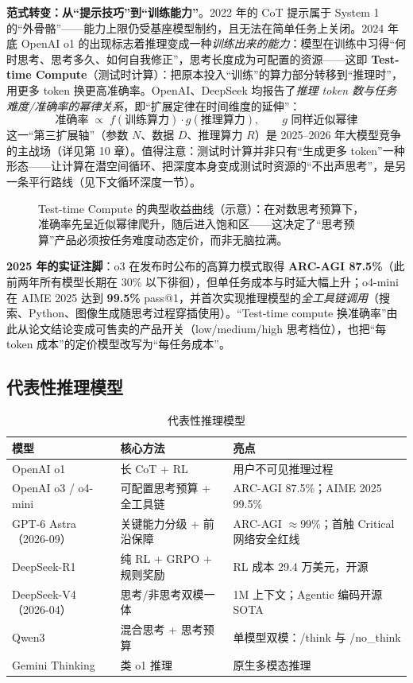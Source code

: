 \documentclass[12pt,a4paper]{article}
\begin{document}
\textbf{范式转变：从“提示技巧”到“训练能力”}。2022 年的 CoT 提示属于 System 1 的“外骨骼”——能力上限仍受基座模型制约，且无法在简单任务上关闭。2024 年底 OpenAI o1 的出现标志着推理变成一种\emph{训练出来的能力}：模型在训练中习得“何时思考、思考多久、如何自我修正”，思考长度成为可配置的资源——这即 \textbf{Test-time Compute}（测试时计算）：把原本投入“训练”的算力部分转移到“推理时”，用更多 token 换更高准确率。OpenAI、DeepSeek 均报告了\emph{推理 token 数与任务难度/准确率的幂律关系}，即“扩展定律在时间维度的延伸”：
\[
\text{准确率} \;\propto\; f(\text{训练算力}) \cdot g(\text{推理算力}), \qquad g \text{ 同样近似幂律}
\]
这一“第三扩展轴”（参数 $N$、数据 $D$、推理算力 $R$）是 2025--2026 年大模型竞争的主战场（详见第 10 章）。值得注意：测试时计算并非只有“生成更多 token”一种形态——让计算在潜空间循环、把深度本身变成测试时资源的“不出声思考”，是另一条平行路线（见下文循环深度一节）。

\begin{figure}[htbp]
\centering

\caption{Test-time Compute 的典型收益曲线（示意）：在对数思考预算下，准确率先呈近似幂律爬升，随后进入饱和区——这决定了“思考预算”产品必须按任务难度动态定价，而非无脑拉满。}
\label{fig:ttc}
\end{figure}

\textbf{2025 年的实证注脚}：o3 在发布时公布的高算力模式取得 \textbf{ARC-AGI 87.5\%}（此前两年所有模型长期在 30\% 以下徘徊），但单任务成本与时延大幅上升；o4-mini 在 AIME 2025 达到 \textbf{99.5\%} pass@1，并首次实现推理模型的\emph{全工具链调用}（搜索、Python、图像生成随思考过程穿插使用）。“Test-time compute 换准确率”由此从论文结论变成可售卖的产品开关（low/medium/high 思考档位），也把“每 token 成本”的定价模型改写为“每任务成本”。

\subsection{代表性推理模型}

\begin{table}[htbp]
\centering
\small
\begin{tabular}{@{}llp{5cm}@{}}
\toprule
\textbf{模型} & \textbf{核心方法} & \textbf{亮点}\\
\midrule
OpenAI o1 & 长 CoT + RL & 用户不可见推理过程\\
OpenAI o3 / o4-mini & 可配置思考预算 + 全工具链 & ARC-AGI 87.5\%；AIME 2025 99.5\%\\
GPT-6 Astra（2026-09） & 关键能力分级 + 前沿保障 & ARC-AGI $\approx$99\%；首触 Critical 网络安全红线\\
DeepSeek-R1 & 纯 RL + GRPO + 规则奖励 & RL 成本 29.4 万美元，开源\\
DeepSeek-V4（2026-04） & 思考/非思考双模一体 & 1M 上下文；Agentic 编码开源 SOTA\\
Qwen3 & 混合思考 + 思考预算 & 单模型双模：/think 与 /no\_think\\
Gemini Thinking & 类 o1 推理 & 原生多模态推理\\
\bottomrule
\end{tabular}
\caption{代表性推理模型}
\end{table}
\end{document}
